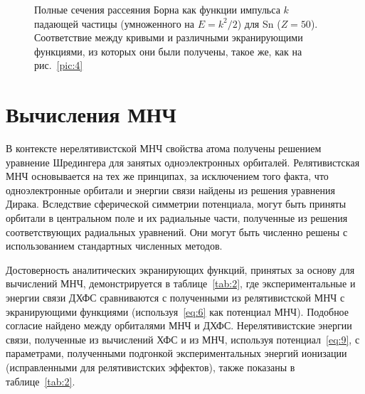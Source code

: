 \documentclass[10pt,pscyr]{hedlab}
\newcommand{\eq}  [1]{\eqref{eq:#1}}
\newcommand{\pic} [1]{\ref{pic:#1}}
\newcommand{\tab} [1]{\ref{tab:#1}}
\begin{document}
  \begin{figure}[htb!]
    \caption{Полные сечения рассеяния Борна как функции импульса \( k \)
      падающей частицы (умноженного на \( E = k^2 / 2 \)) для Sn (\( Z = 50 \)).
      Соответствие между кривыми и различными экранирующими функциями, из
      которых они были получены, такое же, как на рис.~\pic{4}}
    \label{pic:6}
  \end{figure}
  
  \section{Вычисления МНЧ}
  \label{sec:4}
  
  В контексте нерелятивистской МНЧ свойства атома получены решением уравнение
  Шредингера для занятых одноэлектронных орбиталей. Релятивистская МНЧ
  основывается на тех же принципах, за исключением того факта, что
  одноэлектронные орбитали и энергии связи найдены из решения уравнения Дирака.
  Вследствие сферической симметрии потенциала, могут быть приняты орбитали в
  центральном поле и их радиальные части, полученные из решения соответствующих
  радиальных уравнений. Они могут быть численно решены с использованием
  стандартных численных методов.
  
  Достоверность аналитических экранирующих функций, принятых за основу для
  вычислений МНЧ, демонстрируется в таблице~\tab{2}, где экспериментальные и
  энергии связи ДХФС сравниваются с полученными из релятивистской МНЧ с
  экранирующими функциями (используя~\eq{6} как потенциал МНЧ). Подобное
  согласие найдено между орбиталями МНЧ и ДХФС. Нерелятивистские энергии связи,
  полученные из вычислений ХФС и из МНЧ, используя потенциал~\eq{9}, с
  параметрами, полученными подгонкой экспериментальных энергий ионизации
  (исправленными для релятивистских эффектов), также показаны в таблице~\tab{2}.
\end{document}
